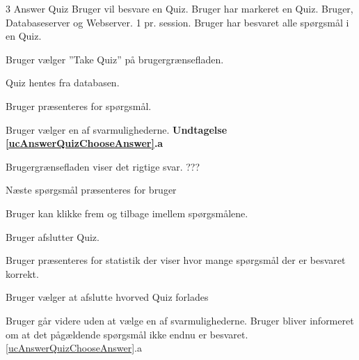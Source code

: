 \uchead
	{3}
	{Answer Quiz}
	{Bruger vil besvare en Quiz.}
	{Bruger har markeret en Quiz.}
	{Bruger, Databaseserver og Webserver.}
	{}
	{1 pr. session.}
	{Bruger har besvaret alle spørgsmål i en Quiz.}

\item Bruger vælger ''Take Quiz'' på brugergrænsefladen.

\item Quiz hentes fra databasen.

\item\label{ucAnswerQuizPresent} Bruger præsenteres for spørgsmål.

\item \label{ucAnswerQuizChooseAnswer} Bruger vælger en af svarmulighederne. 
\textbf{Undtagelse \ref{ucAnswerQuizChooseAnswer}.a}

\item Brugergrænsefladen viser det rigtige svar. ???

\item\label{ucAnswerQuizEnd} Næste spørgsmål præsenteres for bruger 


\item Bruger kan klikke frem og tilbage imellem spørgsmålene.

\item Bruger afslutter Quiz.


\item Bruger præsenteres for statistik der viser hvor mange spørgsmål der er besvaret korrekt.

\item Bruger vælger at afslutte hvorved Quiz forlades

\ucdescriptionend

\ucextension
	{Bruger går videre uden at vælge en af svarmulighederne.}
	{Bruger bliver informeret om at det pågældende spørgsmål ikke endnu er besvaret.}
	{\ref{ucAnswerQuizChooseAnswer}.a}
	


